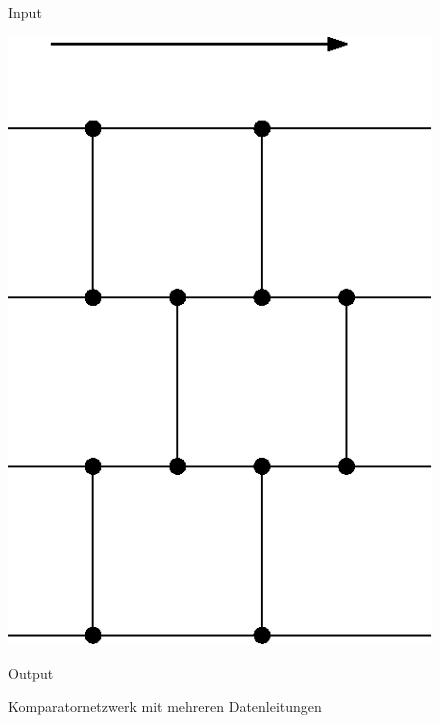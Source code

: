 \documentclass[11pt,ngerman]{article}
\begin{document}
\begin{figure}
\begin{center}
\begin{minipage}[l]{2cm}
Input
\end{minipage}
\begin{minipage}[c]{7cm}
\begin{center}
    \includegraphics[scale=0.8]{bild2Komparatornetzwerk.eps}
\end{center}
\end{minipage}
\begin{minipage}[r]{2cm}
Output
\end{minipage}
\end{center}
\caption{Komparatornetzwerk mit mehreren Datenleitungen}
\label{fig:kompnetsmall}
\end{figure}
\end{document}
